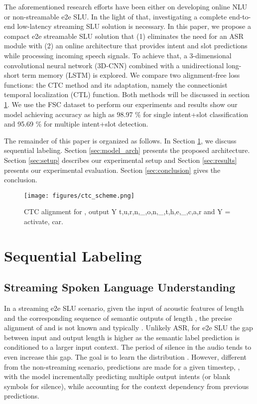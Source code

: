 \documentclass[a4paper]{article}
\begin{document}
The aforementioned research efforts have been either on developing online NLU or non-streamable e2e SLU. In the light of that, investigating a complete end-to-end low-latency streaming SLU solution is necessary. In this paper, we propose a compact e2e streamable SLU solution that (1) eliminates the need for an ASR module with (2) an online architecture that provides intent and slot predictions while processing incoming speech signals. To achieve that, a 3-dimensional convolutional neural network (3D-CNN) combined with a unidirectional long-short term memory (LSTM) is explored. We compare two alignment-free loss functions: the CTC method and its adaptation, namely the connectionist temporal localization (CTL) function. Both methods will be discussed in section \ref{sec:sequential}. We use the FSC dataset to perform our experiments and results show our model achieving accuracy as high as 98.97 \% for single intent+slot classification and 95.69 \% for multiple intent+slot detection.

The remainder of this paper is organized as follows. In Section \ref{sec:sequential}, we discuss sequential labeling. Section \ref{sec:model_arch} presents the proposed architecture. Section \ref{sec:setup} describes our experimental setup and Section \ref{sec:results} presents our experimental evaluation. Section \ref{sec:conclusion} gives the conclusion.

\begin{figure}
\centering
  \texttt{[image: figures/ctc\_scheme.png]}
  \caption{CTC alignment for , output Y    t,u,r,n,\_,o,n,\_,t,h,e,\_,c,a,r and Y = activate, car.}
  \label{fig:ctc}
\end{figure}


\section{Sequential Labeling}
\label{sec:sequential}

\subsection{Streaming Spoken Language Understanding}
\label{subsec:slu}

In a streaming e2e SLU scenario, given the input  of acoustic features of length  and the corresponding sequence of semantic outputs  of length , the precise alignment of  and  is not known and typically . Unlikely ASR, for e2e SLU the gap between input and output length is higher as the semantic label prediction is conditioned to a larger input context. The period of silence in the audio tends to even increase this gap. The goal is to learn the distribution . However, different from the non-streaming scenario, predictions are made for a given timestep, , with the model incrementally predicting multiple output intents (or blank symbols for silence), while accounting for the context dependency from previous predictions. 
\end{document}
